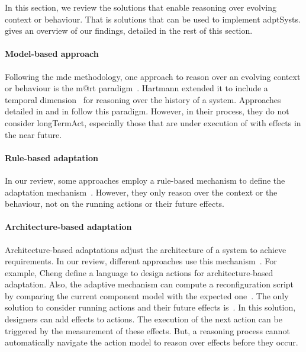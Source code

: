 In this section, we review the solutions that enable reasoning over evolving context or \gls{behaviour}.
That is solutions that can be used to implement \glspl{adptSyst}.
 gives an overview of our findings, detailed in the rest of this section.

\paragraph{Model-based approach}
Following the \gls{mde} methodology, one approach to reason over an evolving context or \gls{behaviour} is the \gls{m@rt} paradigm~\cite{DBLP:journals/computer/BlairBF09, DBLP:journals/computer/MorinBJFS09}.
Hartmann \etal extended it to include a temporal dimension~\cite{DBLP:conf/seke/0001FNMKT14, DBLP:conf/models/0001FNMKBT14} for reasoning over the history of a system.
Approaches detailed in \cite{DBLP:conf/icse/BarbosaLMJ17} and in \cite{DBLP:conf/icse/ChenPYNZ14} follow this paradigm.
However, in their process, they do not consider \gls{longTermAct}, especially those that are under execution of with effects in the near future.

\paragraph{Rule-based adaptation}
In our review, some approaches employ a rule-based mechanism to define the adaptation mechanism~\cite{DBLP:conf/icse/ArcainiRS15, DBLP:conf/icse/TaharaOH17, DBLP:conf/eurosys/GraceHPBCT08}.
However, they only reason over the context or the behaviour, not on the running actions or their future effects.

\paragraph{Architecture-based adaptation}
Architecture-based adaptations adjust the architecture of a system to achieve requirements.
In our review, different approaches use this mechanism~\cite{DBLP:journals/jss/ChengG12, DBLP:journals/computer/GarlanCHSS04, DBLP:journals/computer/GeorgasHT09, DBLP:conf/cbse/FouquetMFBPJ12}.
For example, Cheng \etal define a language to design \glspl{action} for architecture-based adaptation.
Also, the adaptive mechanism can compute a reconfiguration script by comparing the current component model with the expected one~\cite{DBLP:conf/cbse/FouquetMFBPJ12}.
The only solution to consider running \glspl{action} and their future effects is~\cite{DBLP:journals/jss/ChengG12}.
In this solution, designers can add effects to \glspl{action}.
The execution of the next action can be triggered by the measurement of these effects.
But, a reasoning process cannot automatically navigate the action model to reason over effects before they occur.


